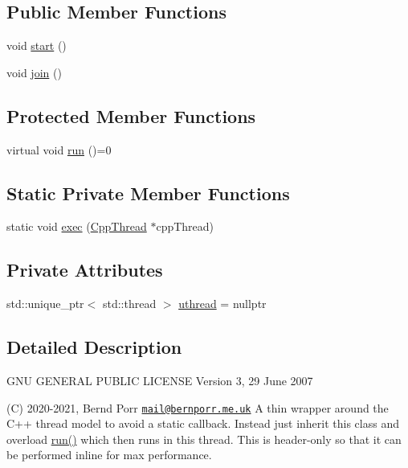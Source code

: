 \subsection*{Public Member Functions}
\begin{DoxyCompactItemize}
\item 
void \hyperlink{classCppThread_a1be46d1be000f41a763289300623c609}{start} ()
\item 
void \hyperlink{classCppThread_a8ff0fda6b913cc53764caef0e1200f3f}{join} ()
\end{DoxyCompactItemize}
\subsection*{Protected Member Functions}
\begin{DoxyCompactItemize}
\item 
virtual void \hyperlink{classCppThread_a792b79e72250710147c452648def4a78}{run} ()=0
\end{DoxyCompactItemize}
\subsection*{Static Private Member Functions}
\begin{DoxyCompactItemize}
\item 
static void \hyperlink{classCppThread_a499b353ef5b5f187ad5eddf638eeb95e}{exec} (\hyperlink{classCppThread}{Cpp\+Thread} $\ast$cpp\+Thread)
\end{DoxyCompactItemize}
\subsection*{Private Attributes}
\begin{DoxyCompactItemize}
\item 
std\+::unique\+\_\+ptr$<$ std\+::thread $>$ \hyperlink{classCppThread_a3136027f60f5054f2a195b7e5fb9f7c9}{uthread} = nullptr
\end{DoxyCompactItemize}


\subsection{Detailed Description}
G\+NU G\+E\+N\+E\+R\+AL P\+U\+B\+L\+IC L\+I\+C\+E\+N\+SE Version 3, 29 June 2007

(C) 2020-\/2021, Bernd Porr \href{mailto:mail@bernporr.me.uk}{\tt mail@bernporr.\+me.\+uk} A thin wrapper around the C++ thread model to avoid a static callback. Instead just inherit this class and overload \hyperlink{classCppThread_a792b79e72250710147c452648def4a78}{run()} which then runs in this thread. This is header-\/only so that it can be performed inline for max performance. 

